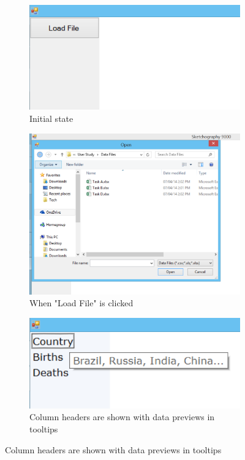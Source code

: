 	\begin{figure}[h]
		\centering
		\begin{subfigure}[b]{0.3\textwidth}
			\includegraphics[width=\textwidth]{data1}
			\caption{Initial state}
			\label{fig:data1}
		\end{subfigure}
		\begin{subfigure}[b]{0.6\textwidth}
			\includegraphics[width=\textwidth]{data2}
			\caption{When "Load File" is clicked}
			\label{fig:data2}
		\end{subfigure}
		\begin{subfigure}[b]{0.5\textwidth}
			\includegraphics[width=\textwidth]{data3}
			\caption{Column headers are shown with data previews in tooltips}
			\label{fig:data3}
		\end{subfigure}
	\end{figure}		
		
